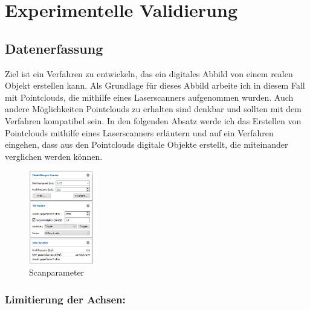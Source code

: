 \documentclass[../main.tex]{subfiles}
\begin{document}
\section{Experimentelle Validierung}

\subsection{Datenerfassung}
Ziel ist ein Verfahren zu entwickeln, das ein digitales Abbild von einem realen Objekt
erstellen kann.
Als Grundlage für dieses Abbild arbeite ich in diesem Fall mit Pointclouds, 
die mithilfe eines Laserscanners aufgenommen wurden. Auch andere Möglichkeiten
Pointclouds zu erhalten sind denkbar und sollten mit dem Verfahren 
kompatibel sein. In den folgenden Absatz werde ich das Erstellen von Pointclouds 
mithilfe eines Laserscanners erläutern und auf ein Verfahren eingehen, dass aus 
den Pointclouds digitale Objekte erstellt, die miteinander verglichen werden können.




\newpage

\begin{figure}
    \includegraphics[width=0.25\textwidth]{images/Parameter_Scan.png}
    \caption{Scanparameter}
    \label{fig:scanparameter}
\end{figure}

\subsubsection{Limitierung der Achsen:}
\end{document}
